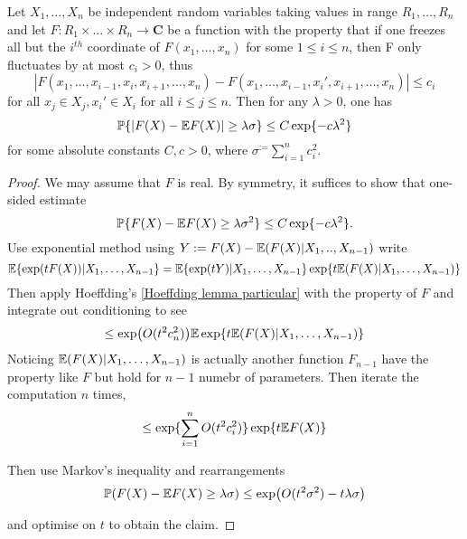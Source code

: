 \begin{theorem}
    Let $X_1,\dots,X_n$ be independent random variables taking values in range $R_1,\dots,R_n$ and let $F: R_1\times \dots \times R_n \to \mathbf C$ be a function with the property that if one freezes all but the $i^{th}$ coordinate of $F(x_1,\dots,x_n)$ for some $1\leq i\leq n$, then F only fluctuates by at most $c_i >0$, thus
    \begin{equation*}
        |F(x_1,\dots,x_{i-1},x_i,x_{i+1},\dots,x_n) - F(x_1,\dots,x_{i-1},x_i',x_{i+1},\dots,x_n)| \leq c_i
    \end{equation*}
    for all $x_j \in X_j,x_i'\in X_i$ for all $i\leq j\leq n$. Then for any $\lambda >0$, one has 
    \begin{equation*}
        \mathbb{P}\{|F(X)-\mathbb{E} F(X)|\geq \lambda \sigma \} \leq C \exp \{-c\lambda^2\}
    \end{equation*}
    for some absolute constants $C,c >0$, where $\sigma^ := \sum_{i=1}^n c_i^2$.
\end{theorem}

\begin{proof}\label{Proof of Mcdiarmid}
    We may assume that $F$ is real. By symmetry, it suffices to show that one-sided estimate
    \begin{equation*}
        \mathbb{P}\{F(X)-\mathbb{E} F(X)\geq \lambda \sigma^2 \}  \leq C \exp \{-c \lambda^2\}.
    \end{equation*}
    Use exponential method using $Y:=F(X)-\mathbb{E} (F(X)|X_1,..   ,X_{n-1})$ write
    \begin{equation*}
        \mathbb{E} \{\exp(tF(X))|X_1,\dots,X_{n-1}\} = \mathbb{E} \{\exp(tY)|X_1,\dots,X_{n-1}\}\exp\{t\mathbb{E}(F(X)|X_1,\dots,X_{n-1})\}
    \end{equation*}
    Then apply Hoeffding's \ref{Hoeffding lemma particular} with the property of $F$ and integrate out conditioning to see
    \begin{equation*}
        \leq \exp(O(t^2c_n^2))\mathbb{E} \exp\{t\mathbb{E} (F(X)|X_1,\dots,X_{n-1})\}
    \end{equation*}
    Noticing $\mathbb{E} (F(X)|X_1,\dots,X_{n-1})$ is actually another function $F_{n-1}$ have the property like $F$ but hold for $n-1$ numebr of parameters. 
    Then iterate the computation $n$ times,
    \begin{equation*}
        \leq \exp\{\sum_{i=1}^n O(t^2c_i^2)\}\exp\{t\mathbb{E} F(X)\}
    \end{equation*}

    Then use Markov's inequality and rearrangements 
    \begin{equation*}
        \mathbb{P} (F(X)-\mathbb{E} F(X)\geq \lambda\sigma) \leq \exp(O(t^2\sigma^2)-t\lambda\sigma)
    \end{equation*}

    and optimise on $t$ to obtain the claim.

\end{proof}

